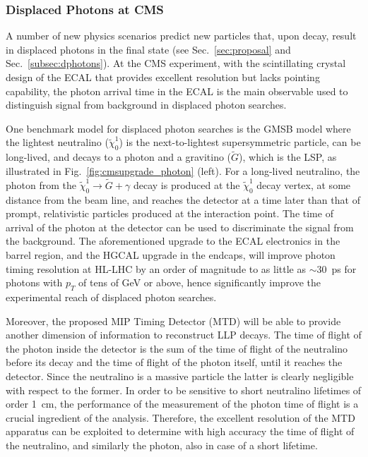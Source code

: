 \subsubsection{Displaced Photons at CMS}


A number of new physics scenarios predict new particles that, upon decay, result in displaced photons in the final state (see Sec.~\ref{sec:proposal} and Sec.~\ref{subsec:dphotons}). At the CMS experiment, with the scintillating crystal design of the ECAL that provides excellent resolution but lacks pointing capability, the photon arrival time in the ECAL is the main observable used to distinguish signal from background in displaced photon searches.

One benchmark model for displaced photon searches is the GMSB model where the lightest neutralino ($\tilde{\chi}_0^1$) is the next-to-lightest supersymmetric particle, can be long-lived, and decays to a photon and a gravitino ($\tilde{G}$), which is the LSP, as illustrated in Fig.~\ref{fig:cmsupgrade_photon} (left). For a long-lived neutralino, the photon from the $\tilde{\chi}_0^1\to\tilde{G}+\gamma$ decay is produced at the $\tilde{\chi}_0^1$ decay vertex, at some distance from the beam line, and reaches the detector at a time later than that of prompt, relativistic particles produced at the interaction point. The time of arrival of the photon at the detector can be used to discriminate the signal from the background. The aforementioned upgrade to the ECAL electronics in the barrel region, and the HGCAL upgrade in the endcaps, will improve photon timing resolution at HL-LHC by an order of magnitude to as little as $\sim30$~ps for photons with $p_T$ of tens of GeV or above, hence significantly improve the experimental reach of displaced photon searches.

Moreover, the proposed MIP Timing Detector (MTD) will be able to provide another dimension of information to reconstruct LLP decays. The time of flight of the photon inside the detector is the sum of the time of flight of the neutralino before its decay and the time of flight of the photon itself, until it reaches the detector. Since the neutralino is a massive particle the latter is clearly negligible with respect to the former. In order to be sensitive to short neutralino lifetimes of order 1~cm, the performance of the measurement of the photon time of flight is a crucial ingredient of the analysis. Therefore, the excellent resolution of the MTD apparatus can be exploited to determine with high accuracy the time of flight of the neutralino, and similarly the photon, also in case of a short lifetime.

